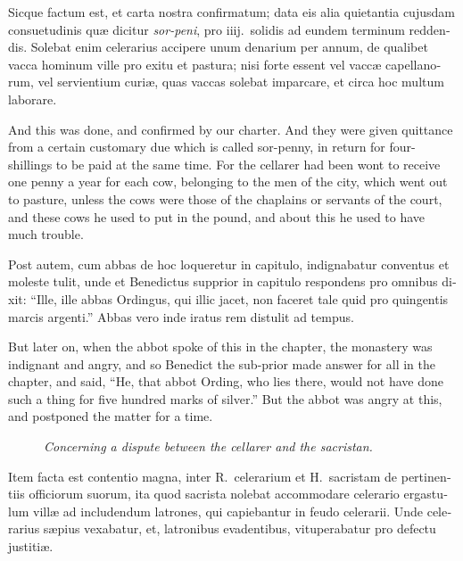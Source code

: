 \documentclass[10pt]{book}
\newcommand{\blockhead}[4][]{
\begin{figure}
\centering
\vspace{#4}
\parbox{2.75cm}{\begin{center}\footnotesize \color{BrickRed} \emph{#2}\\ #1 \end{center}}
\end{figure}
}
\begin{document}
\begin{paracol}{2}
\switchcolumn*

\begin{otherlanguage}{latin}
Sicque factum est, et carta nostra confirmatum; data eis alia quietantia cujusdam consuetudinis qu\ae{} dicitur \emph{sor-peni}, pro iiij.\ solidis ad eundem terminum reddendis. Solebat enim celerarius accipere unum denarium per annum, de qualibet vacca hominum ville pro exitu et pastura; nisi forte essent vel vacc\ae{} capellanorum, vel servientium curi\ae{}, quas vaccas solebat imparcare, et circa hoc multum laborare. 
\end{otherlanguage}

\switchcolumn

And this was done, and confirmed by our charter. And they were given quittance from a certain customary due which is called sor-penny, in return for four-shillings to be paid at the same time. For the cellarer had been wont to receive one penny a year for each cow, belonging to the men of the city, which went out to pasture, unless the cows were those of the chaplains or servants of the court, and these cows he used to put in the pound, and about this he used to have much trouble.

\switchcolumn*

\begin{otherlanguage}{latin}
Post autem, cum abbas de hoc loqueretur in capitulo, indignabatur conventus et moleste tulit, unde et Benedictus supprior in capitulo respondens pro omnibus dixit: ``Ille, ille abbas Ordingus, qui illic jacet, non faceret tale quid pro quingentis marcis argenti.'' Abbas vero inde iratus rem distulit ad tempus. 
\end{otherlanguage}

\switchcolumn

But later on, when the abbot spoke of this in the chapter, the monastery was indignant and angry, and so Benedict the sub-prior made answer for all in the chapter, and said, ``He, that abbot Ording, who lies there, would not have done such a thing for five hundred marks of silver.'' But the abbot was angry at this, and postponed the matter for a time.

\switchcolumn*

\begin{otherlanguage}{latin}
\blockhead{Concerning a dispute between the cellarer and the sacristan.}{4}{-.5cm}
Item facta est contentio magna, inter R.\ celerarium et H.\ sacristam de pertinentiis officiorum suorum, ita quod sacrista nolebat accommodare celerario ergastulum vill\ae{} ad includendum latrones, qui capiebantur in feudo celerarii. Unde celerarius s\ae{}pius vexabatur, et, latronibus evadentibus, vituperabatur pro defectu justiti\ae{}.


\end{otherlanguage}
\end{paracol}
\end{document}
